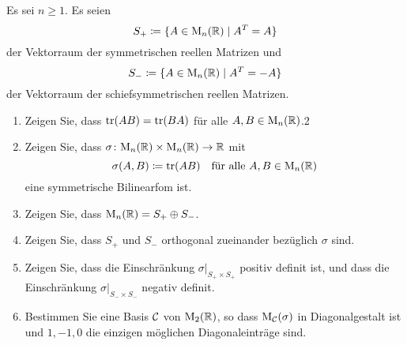 \documentclass[a4paper, 10pt]{scrartcl}
\begin{document}
\begin{question}
  Es sei $n \geq 1$.
  Es seien
  \[
    S_+ \coloneqq \{A \in \mathrm{M}_n(\mathbb{R}) \mid A^T = A\}
  \]
  der Vektorraum der symmetrischen reellen Matrizen und
  \[
    S_- \coloneqq \{A \in \mathrm{M}_n(\mathbb{R}) \mid A^T = -A\}
  \]
  der Vektorraum der schiefsymmetrischen reellen Matrizen.
  \begin{enumerate}[leftmargin=*]
    \item
      Zeigen Sie, dass $\operatorname{tr}(AB) = \operatorname{tr}(BA)$ für alle $A, B \in \mathrm{M}_n(\mathbb{R})$.2
    \item
      Zeigen Sie, dass $\sigma \colon \mathrm{M}_n(\mathbb{R}) \times \mathrm{M}_n(\mathbb{R}) \to \mathbb{R}$ mit
      \[
        \sigma(A,B) \coloneqq \operatorname{tr}(AB)
        \quad
        \text{für alle $A, B \in \mathrm{M}_n(\mathbb{R})$}
      \]
      eine symmetrische Bilinearfom ist.
    \item
      Zeigen Sie, dass $\mathrm{M}_n(\mathbb{R}) = S_+ \oplus S_-$.
    \item
      Zeigen Sie, dass $S_+$ und $S_-$ orthogonal zueinander bezüglich $\sigma$ sind.
    \item
      Zeigen Sie, dass die Einschränkung $\sigma|_{S_+ \times S_+}$ positiv definit ist, und dass die Einschränkung $\sigma|_{S_- \times S_-}$ negativ definit.
    \item
      Bestimmen Sie eine Basis $\mathcal{C}$ von $\mathrm{M}_2(\mathbb{R})$, so dass $\mathrm{M}_{\mathcal{C}}(\sigma)$ in Diagonalgestalt ist und $1, -1, 0$ die einzigen möglichen Diagonaleinträge sind.
  \end{enumerate}
\end{question}

















\newpage


\printsolutions
\end{document}
